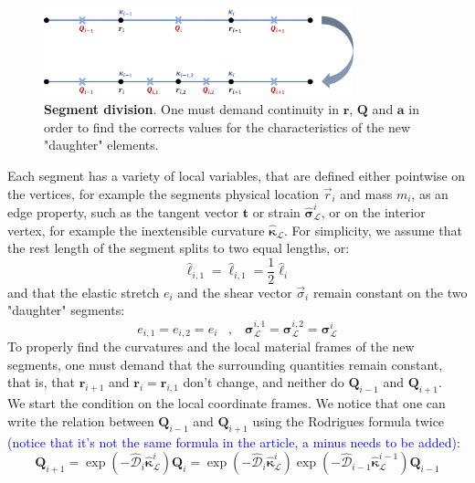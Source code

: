 \documentclass[a4paper, 11pt]{article}
\begin{document}
\begin{figure}[h!]
    \centering
    \includegraphics[width=0.80\textwidth]{seg_div.png}
    \caption{\textbf{Segment division}. One must demand continuity in $\boldsymbol{r}$, $\boldsymbol{Q}$ and $\boldsymbol{a}$ in order to find the corrects values for the characteristics of the new "daughter" elements. } \label{fig:fig1}
\end{figure}
\noindent Each segment has a variety of local variables, that are defined either pointwise on the vertices, for example the segments physical location $\vec{r}_i$ and mass $m_i$, as an edge property, such as the tangent vector $\boldsymbol{t}$ or strain $\hat{\boldsymbol{\sigma}}^i_{\mathcal{L}}$, or on the interior vertex, for example the inextensible curvature $\hat{\boldsymbol{\kappa}}_\mathcal{L}$. 
\noindent For simplicity, we assume that the rest length of the segment splits to two equal lengths, or:
\begin{equation}
\hat{\ell}_{i,1}=\hat{\ell}_{i,1}=\frac{1}{2}\hat{\ell}_i    
\end{equation}
and that the elastic stretch $e_i$ and the shear vector $\vec{\sigma}_i$ remain constant on the two "daughter" segments:
\begin{equation}
    e_{i,1}=e_{i,2}=e_{i}\;\;\;,\;\;\; \boldsymbol{\sigma}^{i,1}_\mathcal{L}=\boldsymbol{\sigma}^{i,2}_\mathcal{L}=\boldsymbol{\sigma}^i_\mathcal{L}
\end{equation}
To properly find the curvatures and the local material frames of the new segments, one must demand that the surrounding quantities remain constant, that is, that $\boldsymbol{r}_{i+1}$ and $\boldsymbol{r}_{i}=\boldsymbol{r}_{i,1}$ don't change, and neither do $\boldsymbol{Q}_{i-1}$ and $\boldsymbol{Q}_{i+1}$.\\
We start the condition on the local coordinate frames. We notice that one can write the relation between $\boldsymbol{Q}_{i-1}$ and $\boldsymbol{Q}_{i+1}$ using the Rodrigues formula twice \textcolor{blue}{(notice that it's not the same formula in the article, a minus needs to be added)}:
\begin{equation}\label{eq:Q1}
    \boldsymbol{Q}_{i+1}=\exp\left(-{\hat{\mathcal{D}}_i\hat{\boldsymbol{\kappa}}^i_\mathcal{L}}\right)\boldsymbol{Q}_i=\exp\left(-{\hat{\mathcal{D}}_i\hat{\boldsymbol{\kappa}}^i_\mathcal{L}}\right)\exp\left(-\hat{\mathcal{D}}_{i-1}\hat{\boldsymbol{\kappa}}^{i-1}_\mathcal{L}\right)\boldsymbol{Q}_{i-1}
\end{equation}
\end{document}
